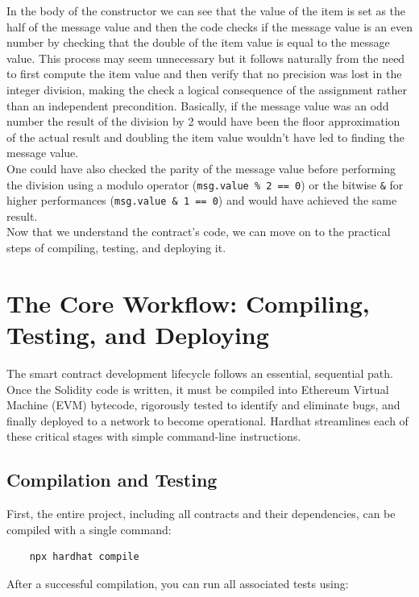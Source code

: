 \documentclass{scrbook}
\begin{document}
In the body of the constructor we can see that the value of the item is set as the half of the message value and then the code checks if the message value is an even number by checking that the double of the item value is equal to the message value. This process may seem unnecessary but it follows naturally from the need to first compute the item value and then verify that no precision was lost in the integer division, making the check a logical consequence of the assignment rather than an independent precondition. Basically, if the message value was an odd number the result of the division by 2 would have been the floor approximation of the actual result and doubling the item value wouldn't have led to finding the message value.\\
One could have also checked the parity of the message value before performing the division using a modulo operator (\texttt{msg.value \% 2 == 0}) or the bitwise \texttt{\&} for higher performances (\texttt{msg.value \& 1 == 0}) and would have achieved the same result.\\

Now that we understand the contract's code, we can move on to the practical steps of compiling, testing, and deploying it.

\chapter{The Core Workflow: Compiling, Testing, and Deploying}

The smart contract development lifecycle follows an essential, sequential path. Once the Solidity code is written, it must be compiled into Ethereum Virtual Machine (EVM) bytecode, rigorously tested to identify and eliminate bugs, and finally deployed to a network to become operational. Hardhat streamlines each of these critical stages with simple command-line instructions.

\section{Compilation and Testing}

First, the entire project, including all contracts and their dependencies, can be compiled with a single command:

\begin{lstlisting}
    npx hardhat compile
\end{lstlisting}

After a successful compilation, you can run all associated tests using:
\end{document}
